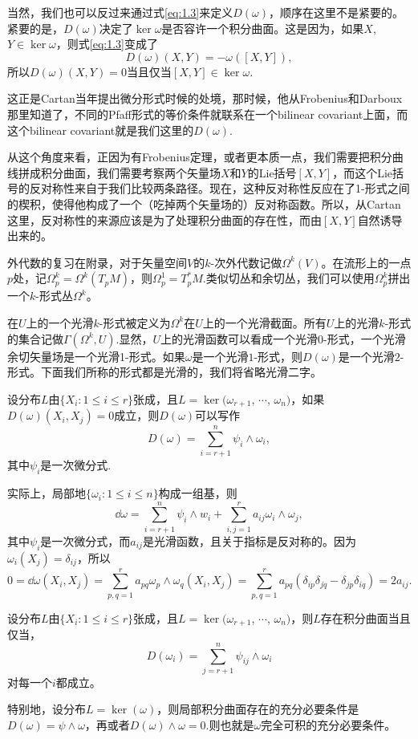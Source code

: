 \para 当然，我们也可以反过来通过式\eqref{eq:1.3}来定义$D(\omega)$，顺序在这里不是紧要的。紧要的是，$D(\omega)$决定了$\ker \omega$是否容许一个积分曲面。这是因为，如果$X$, $Y\in \ker \omega$，则式\eqref{eq:1.3}变成了
\[
	D(\omega)(X,Y)=-\omega([X,Y]),
\]
所以$D(\omega)(X,Y)=0$当且仅当$[X,Y]\in \ker \omega$.

这正是Cartan当年提出微分形式时候的处境，那时候，他从Frobenius和Darboux那里知道了，不同的Pfaff形式的等价条件就联系在一个bilinear covariant上面，而这个bilinear covariant就是我们这里的$D(\omega)$.

从这个角度来看，正因为有Frobenius定理，或者更本质一点，我们需要把积分曲线拼成积分曲面，我们需要考察两个矢量场$X$和$Y$的Lie括号$[X,Y]$，而这个Lie括号的反对称性来自于我们比较两条路径。现在，这种反对称性反应在了1-形式之间的楔积，使得他构成了一个（吃掉两个矢量场的）反对称函数。所以，从Cartan这里，反对称性的来源应该是为了处理积分曲面的存在性，而由$[X,Y]$自然诱导出来的。

\para 外代数的复习在附录，对于矢量空间$V$的$k$-次外代数记做$\Omega^k(V)$。在流形上的一点$p$处，记$\Omega_p^k=\Omega^k(T_pM)$，则$\Omega_p^1=T_p^*M$.类似切丛和余切丛，我们可以使用$\Omega_p^k$拼出一个$k$-形式丛$\Omega^k$。

在$U$上的一个光滑$k$-形式被定义为$\Omega^k$在$U$上的一个光滑截面。所有$U$上的光滑$k$-形式的集合记做$\Gamma(\Omega^k,U)$.显然，$U$上的光滑函数可以看成一个光滑$0$-形式，一个光滑余切矢量场是一个光滑1-形式。如果$\omega$是一个光滑$1$-形式，则$D(\omega)$是一个光滑$2$-形式。下面我们所称的形式都是光滑的，我们将省略光滑二字。

\para 设分布$L$由$\{X_i:1\leq i \leq r\}$张成，且$L=\ker(\omega_{r+1}$, $\cdots$, $\omega_n)$，如果$D(\omega)(X_i,X_j)=0$成立，则$D(\omega)$可以写作\[
	D(\omega)=\sum_{i=r+1}^n \psi_i\wedge \omega_i,
\]
其中$\psi_i$是一次微分式.

实际上，局部地$\{\omega_i:1\leq i\leq n\}$构成一组基，则
\[
	\dd \omega = \sum_{i=r+1}^n \psi_i\wedge w_i +\sum_{i,j=1}^r a_{ij}\omega_i\wedge \omega_j,
\]
其中$\psi_i$是一次微分式，而$a_{ij}$是光滑函数，且关于指标是反对称的。因为$\omega_i(X_j)=\delta_{ij}$，所以
\[
	0=\dd \omega(X_i,X_j)=\sum_{p,q=1}^r a_{pq}\omega_p\wedge \omega_q(X_i,X_j)=\sum_{p,q=1}^r a_{pq}(\delta_{ip}\delta_{jq}-\delta_{jp}\delta_{iq})=2a_{ij}.
\]

\para 设分布$L$由$\{X_i:1\leq i \leq r\}$张成，且$L=\ker(\omega_{r+1}$, $\cdots$, $\omega_n)$，则$L$存在积分曲面当且仅当，
\[
	D(\omega_i)=\sum_{j=r+1}^n \psi_{ij}\wedge \omega_i
\]
对每一个$i$都成立。

特别地，设分布$L=\ker(\omega)$，则局部积分曲面存在的充分必要条件是$D(\omega)=\psi\wedge \omega$，再或者$D(\omega)\wedge \omega=0$.则也就是$\omega$完全可积的充分必要条件。

